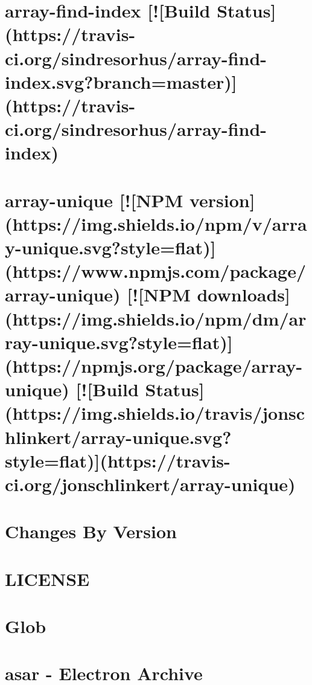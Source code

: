 \documentclass[twoside]{book}
\newcommand{\+}{\discretionary{\mbox{\scriptsize$\hookleftarrow$}}{}{}}
\begin{document}
\chapter{array-\/find-\/index \mbox{[}!\mbox{[}Build Status\mbox{]}(https\+://travis-\/ci.org/sindresorhus/array-\/find-\/index.svg?branch=master)\mbox{]}(https\+://travis-\/ci.org/sindresorhus/array-\/find-\/index)}
\label{md_dsmacc_vis_degree_node_modules_array-find-index_readme}

\chapter{array-\/unique \mbox{[}!\mbox{[}N\+PM version\mbox{]}(https\+://img.shields.\+io/npm/v/array-\/unique.svg?style=flat)\mbox{]}(https\+://www.npmjs.\+com/package/array-\/unique) \mbox{[}!\mbox{[}N\+PM downloads\mbox{]}(https\+://img.shields.\+io/npm/dm/array-\/unique.svg?style=flat)\mbox{]}(https\+://npmjs.org/package/array-\/unique) \mbox{[}!\mbox{[}Build Status\mbox{]}(https\+://img.shields.\+io/travis/jonschlinkert/array-\/unique.svg?style=flat)\mbox{]}(https\+://travis-\/ci.org/jonschlinkert/array-\/unique)}
\label{md_dsmacc_vis_degree_node_modules_array-unique_README}

\chapter{Changes By Version}
\label{md_dsmacc_vis_degree_node_modules_asar_CHANGELOG}

\chapter{L\+I\+C\+E\+N\+SE}
\label{md_dsmacc_vis_degree_node_modules_asar_LICENSE}

\chapter{Glob}
\label{md_dsmacc_vis_degree_node_modules_asar_node_modules_glob_README}

\chapter{asar -\/ Electron Archive}
\label{md_dsmacc_vis_degree_node_modules_asar_README}

\end{document}

